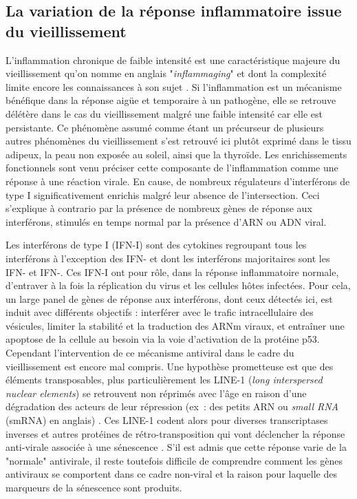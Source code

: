 \subsection{La variation de la réponse inflammatoire issue du vieillissement}

L'inflammation chronique de faible intensité est une caractéristique majeure du vieillissement qu'on nomme en anglais "\textit{inflammaging}"  et dont la complexité limite encore les connaissances à son sujet . Si l'inflammation est un mécanisme bénéfique dans la réponse aigüe et temporaire à un pathogène, elle se retrouve délétère dans le cas du vieillissement malgré une faible intensité car elle est persistante. Ce phénomène assumé comme étant un précurseur de plusieurs autres phénomènes du vieillissement  s'est retrouvé ici plutôt exprimé dans le tissu adipeux, la peau non exposée au soleil, ainsi que la thyroïde. Les enrichissements fonctionnels sont venu préciser cette composante de l'inflammation comme une réponse à une réaction virale. En cause, de nombreux régulateurs d'interférons de type I significativement enrichis malgré leur absence de l'intersection. Ceci s'explique à contrario par la présence de nombreux gènes de réponse aux interférons, stimulés en temps normal par la présence d'ARN ou ADN viral.

Les interférons de type I (IFN-I) sont des cytokines regroupant tous les interférons à l'exception des IFN-\textgamma{} et dont les interférons majoritaires sont les IFN-\textalpha{} et IFN-\textbeta{}. Ces IFN-I ont pour rôle, dans la réponse inflammatoire normale, d'entraver à la fois la réplication du virus et les cellules hôtes infectées. Pour cela, un large panel de gènes de réponse aux interférons, dont ceux détectés ici, est induit avec différents objectifs : interférer avec le trafic intracellulaire des vésicules, limiter la stabilité et la traduction des ARNm viraux, et entraîner une apoptose de la cellule au besoin via la voie d'activation de la protéine p53. Cependant l'intervention de ce mécanisme antiviral dans le cadre du vieillissement est encore mal compris. Une hypothèse prometteuse est que des éléments transposables, plus particulièrement les LINE-1 (\textit{long interspersed nuclear elements}) se retrouvent non réprimés avec l'âge en raison d'une dégradation des acteurs de leur répression (ex : des petits ARN ou \textit{small RNA} (smRNA) en anglais) . Ces LINE-1 codent alors pour diverses transcriptases inverses et autres protéines de rétro-transposition qui vont déclencher la réponse anti-virale associée à une sénescence . S'il est admis que cette réponse varie de la "normale" antivirale, il reste toutefois difficile de comprendre comment les gènes antiviraux se comportent dans ce cadre non-viral  et la raison pour laquelle des marqueurs de la sénescence sont produits.

